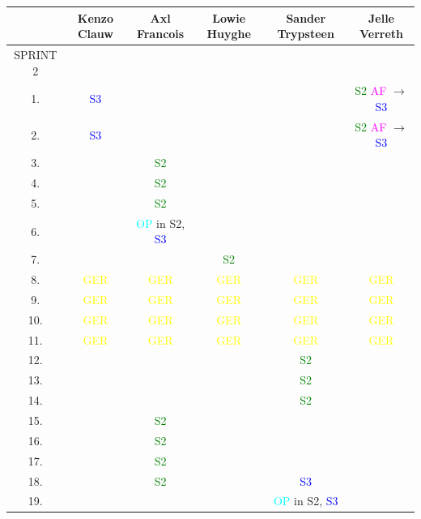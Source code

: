 \documentclass[pdftex,a4paper,12pt,twoside]{report}
\begin{document}
\newpage 
\begin{tabular}{|c|c|c|c|c|c|}
\hline  & Kenzo Clauw & Axl Francois & Lowie Huyghe & Sander Trypsteen & Jelle Verreth \\ 
\hline SPRINT 2 &  &  &  &  &  \\
\hline 1. & \textcolor{blue}{S3} &  &  &  & \textcolor{green}{S2} \textcolor{magenta}{AF} $\rightarrow$ \textcolor{blue}{S3}  \\ 
\hline 2. & \textcolor{blue}{S3}  &  &  &  & \textcolor{green}{S2} \textcolor{magenta}{AF} $\rightarrow$ \textcolor{blue}{S3}  \\ 
\hline 3.  &  & \textcolor{green}{S2}  &  &  &  \\
\hline 4.  &  & \textcolor{green}{S2}  &  &  &  \\
\hline 5.  &  & \textcolor{green}{S2} &  &  &  \\
\hline 6.  &  &\textcolor{cyan}{OP} in S2, \textcolor{blue}{S3}  &  &  &  \\
\hline 7.  &  &  & \textcolor{green}{S2} &  &  \\
\hline 8. & \textcolor{yellow}{GER} & \textcolor{yellow}{GER}  &\textcolor{yellow}{GER}  & \textcolor{yellow}{GER} & \textcolor{yellow}{GER} \\
\hline 9. & \textcolor{yellow}{GER} & \textcolor{yellow}{GER}  &\textcolor{yellow}{GER}  & \textcolor{yellow}{GER} & \textcolor{yellow}{GER} \\
\hline 10. & \textcolor{yellow}{GER} & \textcolor{yellow}{GER}  &\textcolor{yellow}{GER}  & \textcolor{yellow}{GER} & \textcolor{yellow}{GER} \\
\hline 11.& \textcolor{yellow}{GER} & \textcolor{yellow}{GER}  &\textcolor{yellow}{GER}  & \textcolor{yellow}{GER} & \textcolor{yellow}{GER} \\
\hline 12. &  &  &  & \textcolor{green}{S2}  &  \\ 
\hline 13.  &  &  &  &\textcolor{green}{S2}   &  \\
\hline 14.  &  &  &  &\textcolor{green}{S2}   &  \\
\hline 15.  &  & \textcolor{green}{S2}  &  &  &  \\
\hline 16.  &  & \textcolor{green}{S2}  &  &  &  \\
\hline 17.  &  & \textcolor{green}{S2}  &  &  &  \\
\hline 18.  &  & \textcolor{green}{S2}  &  &  \textcolor{blue}{S3}  &  \\
\hline 19. &  &  &  & \textcolor{cyan}{OP} in S2, \textcolor{blue}{S3} &  \\

\end{tabular}
\end{document}
